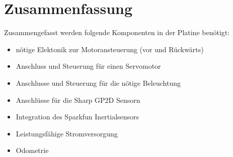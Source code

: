 \section{Zusammenfassung}

Zusammengefasst werden folgende Komponenten in der Platine benötigt:

\begin{itemize}
 \item nötige Elektonik zur Motoransteuerung (vor und Rückwärts)
 \item Anschluss und Steuerung für einen Servomotor
 \item Anschlusse und Steuerung für die nötige Beleuchtung
 \item Anschlüsse für die Sharp GP2D Sensorn
 \item Integration des Sparkfun Inertialsensors
 \item Leistungsfähige Stromversorgung
 \item Odometrie
\end{itemize}







% 

